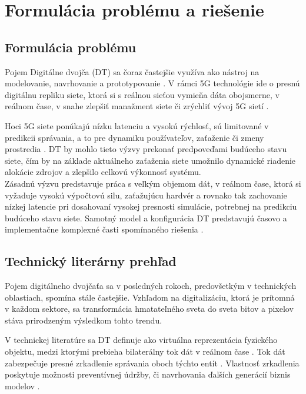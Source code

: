 \chapter{Formulácia problému a riešenie}

\section{Formulácia problému}
\par{
Pojem Digitálne dvojča (DT) sa čoraz častejšie využíva ako nástroj na modelovanie, navrhovanie a prototypovanie \cite{dt-iot}. V rámci 5G technológie ide o presnú digitálnu repliku siete, ktorá si s reálnou sieťou vymieňa dáta obojsmerne, v reálnom čase, v snahe zlepšiť manažment siete či zrýchliť vývoj 5G sietí \cite{systematicReview}.
}
\par{
Hoci 5G siete ponúkajú nízku latenciu a vysokú rýchlosť, sú limitované v predikcii správania, a to pre dynamiku používateľov, zaťaženie či zmeny prostredia \cite{dt-network}. DT by mohlo tieto výzvy prekonať predpoveďami budúceho stavu siete, čím by na základe aktuálneho zaťaženia siete umožnilo dynamické riadenie alokácie zdrojov a zlepšilo celkovú výkonnosť systému\cite{5g-challenges}.
\\ 
Zásadnú výzvu predstavuje práca s veľkým objemom dát, v reálnom čase, ktorá si vyžaduje vysokú výpočtovú silu, zaťažujúcu hardvér \cite{challenges-technol} a rovnako tak zachovanie nízkej latencie pri dosahovaní vysokej presnosti simulácie, potrebnej na predikciu budúceho stavu siete. Samotný model a konfigurácia DT predstavujú časovo a implementačne komplexné časti spomínaného riešenia \cite{challengesAndApplicationsReview}.
}

\section{Technický literárny prehľad}
\par{
Pojem digitálneho dvojčaťa sa v posledných rokoch, predovšetkým v technických oblastiach, spomína stále častejšie. Vzhľadom na digitalizáciu, ktorá je prítomná v každom sektore, sa transformácia hmatateľného sveta do sveta bitov a pixelov stáva prirodzeným výsledkom tohto trendu. 
}
\par{
V technickej literatúre sa DT definuje ako virtuálna reprezentácia fyzického objektu, medzi ktorými prebieha bilaterálny tok dát v reálnom čase \cite{DT:OriginToFuture}. Tok dát zabezpečuje presné zrkadlenie správania oboch týchto entít \cite{systematicReview}. Vlastnosť zrkadlenia poskytuje možnosti preventívnej údržby, či navrhovania ďalších generácií biznis modelov \cite{5g&beyond}.
}

